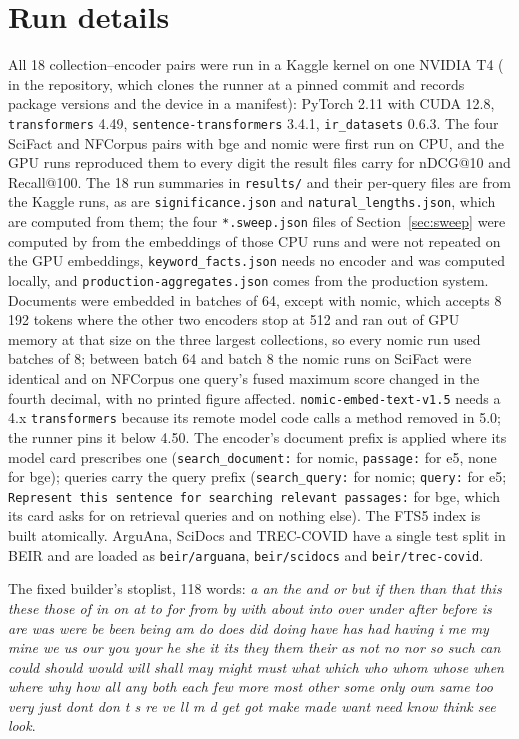 \documentclass[11pt]{article}
\begin{document}
\section{Run details}
\label{app:run}
{\sloppy
All 18 collection--encoder pairs were run in a Kaggle kernel on one NVIDIA T4 ( in the repository, which clones the runner at a pinned commit and records package versions and the device in a manifest): PyTorch 2.11 with CUDA 12.8, \texttt{transformers} 4.49, \texttt{sentence-transformers} 3.4.1, \texttt{ir\_datasets} 0.6.3. The four SciFact and NFCorpus pairs with bge and nomic were first run on CPU, and the GPU runs reproduced them to every digit the result files carry for nDCG@10 and Recall@100. The 18 run summaries in \texttt{results/} and their per-query files are from the Kaggle runs, as are \texttt{significance.json} and \texttt{natural\_lengths.json}, which are computed from them; the four \texttt{*.sweep.json} files of Section~\ref{sec:sweep} were computed by  from the embeddings of those CPU runs and were not repeated on the GPU embeddings, \texttt{keyword\_facts.json} needs no encoder and was computed locally, and \texttt{production-aggregates.json} comes from the production system. Documents were embedded in batches of 64, except with nomic, which accepts 8\,192 tokens where the other two encoders stop at 512 and ran out of GPU memory at that size on the three largest collections, so every nomic run used batches of 8; between batch 64 and batch 8 the nomic runs on SciFact were identical and on NFCorpus one query's fused maximum score changed in the fourth decimal, with no printed figure affected. \texttt{nomic-embed-text-v1.5} needs a 4.x \texttt{transformers} because its remote model code calls a method removed in 5.0; the runner pins it below 4.50. The encoder's document prefix is applied where its model card prescribes one (\texttt{search\_document:} for nomic, \texttt{passage:} for e5, none for bge); queries carry the query prefix (\texttt{search\_query:} for nomic; \texttt{query:} for e5; \texttt{Represent this sentence for searching relevant passages:} for bge, which its card asks for on retrieval queries and on nothing else). The FTS5 index is built atomically. ArguAna, SciDocs and TREC-COVID have a single test split in BEIR and are loaded as \texttt{beir/arguana}, \texttt{beir/scidocs} and \texttt{beir/trec-covid}.

The fixed builder's stoplist, 118 words: \emph{a an the and or but if then than that this these those of in on at to for from by with about into over under after before is are was were be been being am do does did doing have has had having i me my mine we us our you your he she it its they them their as not no nor so such can could should would will shall may might must what which who whom whose when where why how all any both each few more most other some only own same too very just dont don t s re ve ll m d get got make made want need know think see look}.

}
\end{document}
